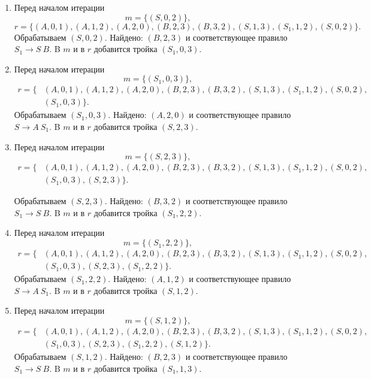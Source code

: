 \begin{example}
\begin{enumerate}
   \item
   Перед началом итерации 
     $$
     m = \{(S, 0, 2)\},
     $$ 
     $$
     r= \{(A,0,1),(A,1,2),(A,2,0),(B,2,3),(B,3,2),(S,1,3),(S_1, 1, 2),(S, 0, 2)\}.
     $$
     Обрабатываем $(S, 0, 2)$. 
     Найдено: $(B,2,3)$ и соответствующее правило $S_1 \to S \ B$. 
     B $m$ и в $r$ добавится тройка $(S_1, 0, 3)$. 

   \item
   Перед началом итерации 
     $$
     m = \{(S_1, 0, 3)\},
     $$ 
     \begin{align*}
     r= \{&(A,0,1),(A,1,2),(A,2,0),(B,2,3),(B,3,2),(S,1,3),(S_1, 1, 2),(S, 0, 2),\\
          &(S_1, 0, 3)\}.
     \end{align*}
     Обрабатываем $(S_1, 0, 3)$. 
     Найдено: $(A,2,0)$ и соответствующее правило $S \to A \ S_1$. 
     B $m$ и в $r$ добавится тройка $(S, 2, 3)$. 

   \item
   Перед началом итерации 
     $$
     m = \{(S, 2, 3)\},
     $$ 
     \begin{align*}
     r= \{&(A,0,1),(A,1,2),(A,2,0),(B,2,3),(B,3,2),(S,1,3),(S_1, 1, 2),(S, 0, 2),\\
          &(S_1, 0, 3),(S, 2, 3)\}.
     \end{align*}

     Обрабатываем $(S, 2, 3)$. 
     Найдено: $(B,3,2)$ и соответствующее правило $S_1 \to S \ B$. 
     B $m$ и в $r$ добавится тройка $(S_1, 2, 2)$. 

   \item
   Перед началом итерации 
     $$
     m = \{(S_1, 2, 2)\},
     $$ 
     \begin{align*}
     r= \{&(A,0,1),(A,1,2),(A,2,0),(B,2,3),(B,3,2),(S,1,3),(S_1, 1, 2),(S, 0, 2),\\
          &(S_1, 0, 3),(S, 2, 3),(S_1, 2, 2)\}.
     \end{align*}
     Обрабатываем $(S_1, 2, 2)$. 
     Найдено: $(A,1,2)$ и соответствующее правило $S \to A \ S_1$. 
     B $m$ и в $r$ добавится тройка $(S, 1, 2)$. 

   \item
   Перед началом итерации 
     $$
     m = \{(S, 1, 2)\},
     $$ 
     \begin{align*}
     r= \{&(A,0,1),(A,1,2),(A,2,0),(B,2,3),(B,3,2),(S,1,3),(S_1, 1, 2),(S, 0, 2),\\
          &(S_1, 0, 3),(S, 2, 3),(S_1, 2, 2),(S, 1, 2)\}.
     \end{align*}
     Обрабатываем $(S, 1, 2)$. 
     Найдено: $(B,2,3)$ и соответствующее правило $S_1 \to S \ B$. 
     B $m$ и в $r$ добавится тройка $(S_1, 1, 3)$. 


\end{enumerate}
\end{example}
